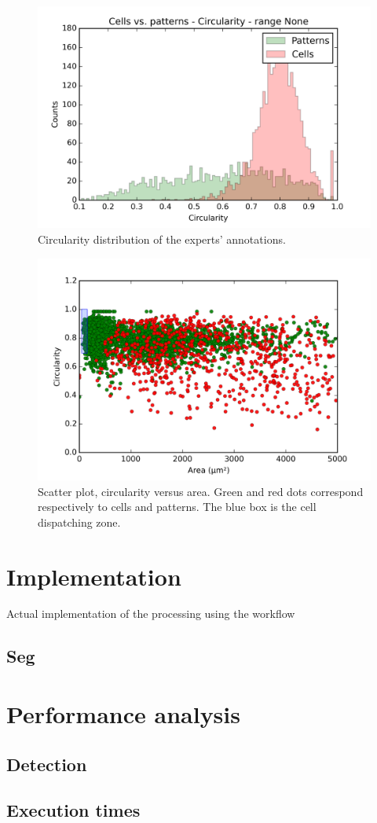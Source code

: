 \begin{figure}
	\center
	\includegraphics[scale=0.75]{image/cells_patterns_circ.png}
	\caption{Circularity distribution of the experts' annotations.}
	\label{fig:hist_circ_cell_vs_pattern}
\end{figure}

\begin{figure}
	\center
	\includegraphics[scale=0.75]{image/scatter_cells_patterns_0_5000.png}
	\caption{Scatter plot, circularity versus area. Green and red dots correspond respectively to cells and patterns. The blue box is the cell dispatching zone.}
	\label{fig:scatter_area_circ_cell_vs_pattern}
\end{figure}

\section{Implementation}
\label{sec:thyroid_implementation}
Actual implementation of the processing using the workflow

\subsection{Seg}
\section{Performance analysis}
\label{sec:thyroid_perf}
\subsection{Detection}
\subsection{Execution times}